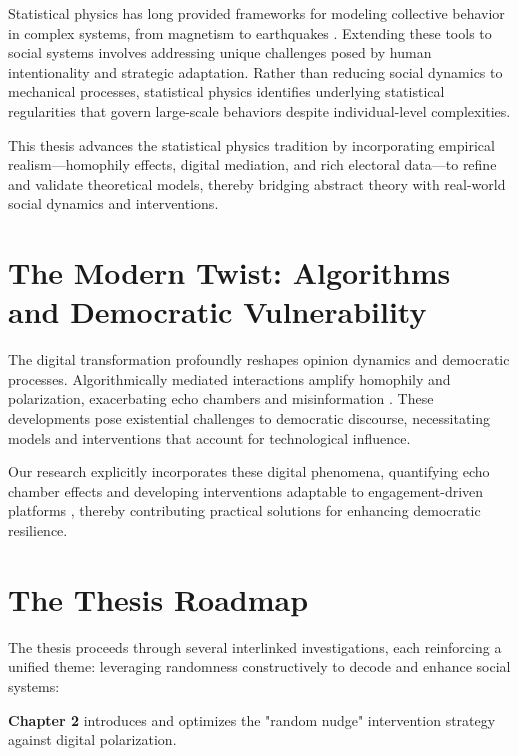 Statistical physics has long provided frameworks for modeling collective behavior in complex systems, from magnetism to earthquakes \cite{galam2012sociophysics, REI65, Corral2004, PleGopRos1999}. Extending these tools to social systems involves addressing unique challenges posed by human intentionality and strategic adaptation. Rather than reducing social dynamics to mechanical processes, statistical physics identifies underlying statistical regularities that govern large-scale behaviors despite individual-level complexities.

This thesis advances the statistical physics tradition by incorporating empirical realism—homophily effects, digital mediation, and rich electoral data—to refine and validate theoretical models, thereby bridging abstract theory with real-world social dynamics and interventions.

\section{The Modern Twist: Algorithms and Democratic Vulnerability}

The digital transformation profoundly reshapes opinion dynamics and democratic processes. Algorithmically mediated interactions amplify homophily and polarization, exacerbating echo chambers and misinformation \cite{link-recommendation-algorithms-and-dynamics-of-polarization-in-social-networks, echo-chambers-online, echo-chambers-emotional-contagion-and-group-polarization-on-facebook}. These developments pose existential challenges to democratic discourse, necessitating models and interventions that account for technological influence.

Our research explicitly incorporates these digital phenomena, quantifying echo chamber effects and developing interventions adaptable to engagement-driven platforms \cite{depolarization-of-echo-chambers-by-random-dynamical-nudge}, thereby contributing practical solutions for enhancing democratic resilience.

\section{The Thesis Roadmap}

The thesis proceeds through several interlinked investigations, each reinforcing a unified theme: leveraging randomness constructively to decode and enhance social systems:

\textbf{Chapter 2} introduces and optimizes the "random nudge" intervention strategy against digital polarization.

